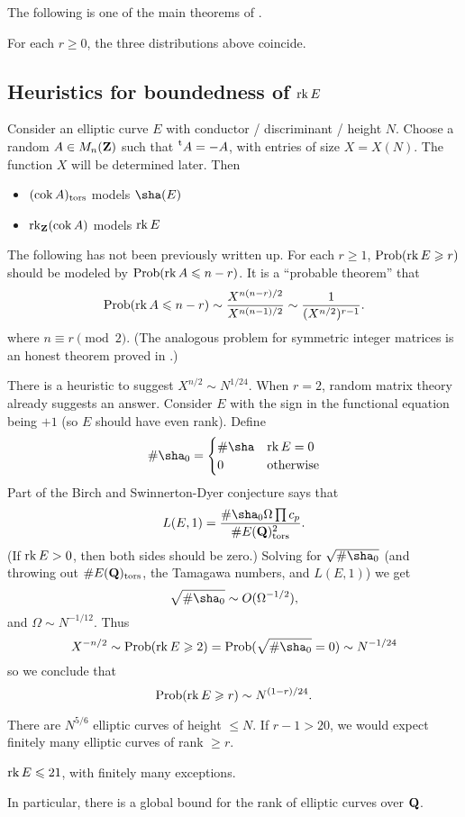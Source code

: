 The following is one of the main theorems of \cite{bklpr13}. 

\begin{theo}
For each $r\geqslant 0$, the three distributions above coincide. 
\end{theo}





\subsection{Heuristics for boundedness of \texorpdfstring{$\operatorname{rk} E$}{rk E}}

Consider an elliptic curve $E$ with conductor / discriminant / height $N$. 
Choose a random $A\in M_n(\mathbf{Z})$ such that $\prescript{\mathrm{t}}{}{A}=-A$, with entries 
of size $X=X(N)$. The function $X$ will be determined later. Then 
\begin{itemize}
  \item $(\operatorname{cok} A)_\mathrm{tors}$ models $\sha(E)$ 
  \item $\operatorname{rk}_{\mathbf{Z}}(\operatorname{cok} A)$ models $\operatorname{rk} E$
\end{itemize}

The following has not been previously written up. For each $r\geqslant 1$, 
$\operatorname{Prob}(\operatorname{rk} E\geqslant r)$ should be modeled by 
$\operatorname{Prob}(\operatorname{rk} A\leqslant n-r)$. It is a ``probable theorem'' that 
\[
  \operatorname{Prob}(\operatorname{rk} A\leqslant n-r) \sim \frac{X^{n(n-r)/2}}{X^{n(n-1)/2}} \sim \frac{1}{(X^{n/2})^{r-1}} .
\]
where $n\equiv r\pmod 2$. (The analogous problem for symmetric integer matrices 
is an honest theorem proved in \cite{ek95}.) 

There is a heuristic to suggest $X^{n/2}\sim N^{1/24}$. When $r=2$, random 
matrix theory already suggests an answer. Consider $E$ with the sign in the 
functional equation being $+1$ (so $E$ should have even rank). Define 
\[
  \# \sha_0 = \begin{cases} \# \sha & \rank E=0 \\ 0 & \text{otherwise} \end{cases}
\]
Part of the Birch and Swinnerton-Dyer conjecture says that 
\[
  L(E,1) = \frac{\# \sha_0 \Omega \prod c_p}{\# E(\dQ)_\mathrm{tors}^2} .
\]
(If $\operatorname{rk} E>0$, then both sides should be zero.) Solving for 
$\sqrt{\#\sha_0}$ (and throwing out $\#E(\mathbf{Q})_\mathrm{tors}$, the Tamagawa 
numbers, and $L(E,1)$) we get 
\[
  \sqrt{\#\sha_0} \sim O(\Omega^{-1/2}) ,
\]
and $\Omega\sim N^{-1/12}$. Thus 
\[
  X^{-n/2} \sim \probability(\rank E\geqslant 2) = \probability(\sqrt{\#\sha_0} = 0) \sim N^{-1/24}
\]
so we conclude that 
\[
  \operatorname{Prob}(\operatorname{rk} E\geqslant r) \sim N^{(1-r)/24} .
\]

There are $N^{5/6}$ elliptic curves of height $\leqslant N$. If $r-1>20$, we 
would expect finitely many elliptic curves of rank $\geqslant r$. 

\begin{prediction}
$\operatorname{rk} E\leqslant 21$, with finitely many exceptions. 
\end{prediction}

In particular, there is a global bound for the rank of elliptic curves over 
$\mathbf{Q}$. 




